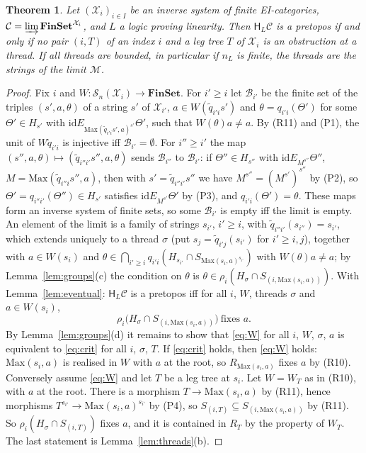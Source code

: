 \documentclass[11pt]{amsart}
\newtheorem{thm}{Theorem}[section]
\theoremstyle{definition}
\newcommand{\Fin}{\mathbf{FinSet}}
\newcommand{\Max}{\mathrm{Max}}
\newcommand{\HH}{\mathsf H}
\newcommand{\cX}{\mathcal X}
\newcommand{\cC}{\mathcal C}
\newcommand{\cM}{\mathcal M}
\newcommand{\cS}{\mathcal S}
\newcommand{\id}{\mathrm{id}}
\begin{document}
\begin{thm}\label{thm:general}
Let $(\cX_i)_{i\in I}$ be an inverse system of finite EI-categories,
$\cC=\varinjlim\Fin^{\cX_i}$, and $L$ a logic proving linearity. Then
$\HH_L\cC$ is a pretopos if and only if no pair $(i,T)$ of an index
$i$ and a leg tree $T$ of $\cX_i$ is an obstruction at a thread. If
all threads are bounded, in particular if $n_L$ is finite, the threads
are the strings of the limit $\cM$.
\end{thm}
\begin{proof}
Fix $i$ and $W\colon\cS_n(\cX_i)\to\Fin$. For $i'\ge i$ let
$\mathcal B_{i'}$ be the finite set of the triples $(s',a,\theta)$ of
a string $s'$ of $\cX_{i'}$, $a\in W(\tilde q_{i'i}s')$ and
$\theta=q_{i'i}(\Theta')$ for some $\Theta'\in H_{s'}$ with
$\id\mathrel{E_{\Max(\tilde q_{i'i}s',a)^{s'}}}\Theta'$, such that
$W(\theta)a\ne a$. By (R11) and (P1), the unit of $W\tilde q_{i'i}$ is
injective iff $\mathcal B_{i'}=\emptyset$. For $i''\ge i'$ the map
$(s'',a,\theta)\mapsto(\tilde q_{i''i'}s'',a,\theta)$ sends $\mathcal
B_{i''}$ to $\mathcal B_{i'}$: if $\Theta''\in H_{s''}$ with
$\id\mathrel{E_{M^{s''}}}\Theta''$, $M=\Max(\tilde q_{i''i}s'',a)$,
then with $s'=\tilde q_{i''i'}s''$ we have $M^{s''}=(M^{s'})^{s''}$ by
(P2), so $\Theta'=q_{i''i'}(\Theta'')\in H_{s'}$ satisfies
$\id\mathrel{E_{M^{s'}}}\Theta'$ by (P3), and
$q_{i'i}(\Theta')=\theta$. These maps form an inverse system of finite
sets, so some $\mathcal B_{i'}$ is empty iff the limit is empty. An
element of the limit is a family of strings $s_{i'}$, $i'\ge i$, with
$\tilde q_{i''i'}(s_{i''})=s_{i'}$, which extends uniquely to a thread
$\sigma$ (put $s_j=\tilde q_{i'j}(s_{i'})$ for $i'\ge i,j$), together
with $a\in W(s_i)$ and $\theta\in\bigcap_{i'\ge i}q_{i'i}(H_{s_{i'}}
\cap S_{\Max(s_i,a)^{s_{i'}}})$ with $W(\theta)a\ne a$; by
Lemma~\ref{lem:groups}(c) the condition on $\theta$ is $\theta\in
\rho_i(H_\sigma\cap S_{(i,\Max(s_i,a))})$. With
Lemma~\ref{lem:eventual}: $\HH_L\cC$ is a pretopos iff for all $i$,
$W$, threads $\sigma$ and $a\in W(s_i)$,
\begin{equation}\label{eq:W}
\rho_i\bigl(H_\sigma\cap S_{(i,\Max(s_i,a))}\bigr)\ \text{fixes }a.
\end{equation}
By Lemma~\ref{lem:groups}(d) it remains to show that \eqref{eq:W} for
all $i$, $W$, $\sigma$, $a$ is equivalent to \eqref{eq:crit} for all
$i$, $\sigma$, $T$. If \eqref{eq:crit} holds, then \eqref{eq:W}
holds: $\Max(s_i,a)$ is realised in $W$ with $a$ at the root, so
$R_{\Max(s_i,a)}$ fixes $a$ by (R10). Conversely assume \eqref{eq:W}
and let $T$ be a leg tree at $s_i$. Let $W=W_T$ as in (R10), with $a$
at the root. There is a morphism $T\to\Max(s_i,a)$ by (R11), hence
morphisms $T^{s_{i'}}\to\Max(s_i,a)^{s_{i'}}$ by (P4), so
$S_{(i,T)}\subseteq S_{(i,\Max(s_i,a))}$ by (R11). So
$\rho_i(H_\sigma\cap S_{(i,T)})$ fixes $a$, and it is contained in
$R_T$ by the property of $W_T$. The last statement is
Lemma~\ref{lem:threads}(b).
\end{proof}
\end{document}
